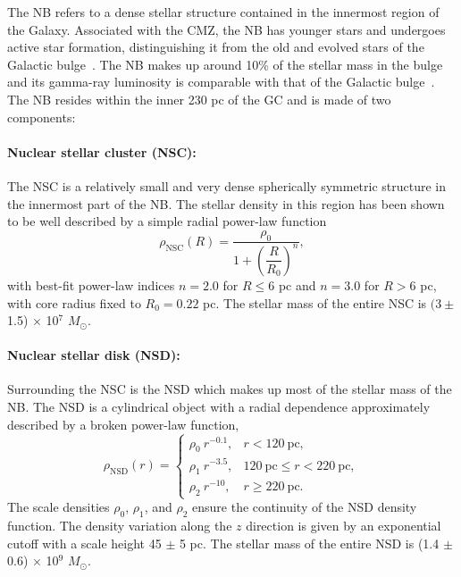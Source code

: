 \documentclass[doublespace,nopageskip]{VTthesis} %
\begin{document}
The NB refers to a dense stellar structure contained in the innermost region of the Galaxy. Associated with the CMZ, the NB has younger stars and undergoes active star formation, distinguishing it from the old and evolved stars of the Galactic bulge~\cite{Launhardt:2002tx}. The NB makes up around 10\% of the stellar mass in the bulge and its gamma-ray luminosity is comparable with that of the Galactic bulge~\cite{Macias:2016nev,Bartels:2017vsx}. The NB resides within the inner 230 pc of the GC and is made of two components:

\paragraph{Nuclear stellar cluster (NSC):} The NSC is a relatively small and very dense spherically symmetric structure in the innermost part of the NB. The stellar density in this region has been shown~\cite{Launhardt:2002tx} to be well described by a simple radial power-law function
\begin{equation}\label{eq:NSC}
  \rho_{\text{NSC}}(R)=\dfrac{\rho_0}{1+\left(\dfrac{R}{R_0}\right)^{n}},
\end{equation}
with best-fit power-law indices $n = 2.0$ for $R \leq 6$ pc and $n = 3.0$ for $R > 6$ pc, with core radius fixed to $R_0 = 0.22$ pc. The stellar mass of the entire NSC is $(3\pm$ 1.5) $\times$ 10$^7$ $M_\odot$.

\paragraph{Nuclear stellar disk (NSD):} Surrounding the NSC is the NSD which makes up most of the stellar mass of the NB. The NSD is a cylindrical object with a radial dependence approximately described by a broken power-law function,
\begin{equation}\label{eq:rhonsd}
  \rho_{\text{NSD}}(r) = \begin{cases}
    \rho_0\ r^{-0.1}, & r < 120\ \text{pc},\\
    \rho_1\ r^{-3.5}, & 120\ \text{pc} \leq r < 220\ \text{pc},\\
    \rho_2\ r^{-10}, & r \geq 220\ \text{pc}.
  \end{cases}
\end{equation}
The scale densities $\rho_0$, $\rho_1$, and $\rho_2$ ensure the continuity of the NSD density function. The density variation along the $z$ direction is given by an exponential cutoff with a scale height 45 $\pm$ 5 pc. The stellar mass of the entire NSD is (1.4 $\pm$ 0.6) $\times$ 10$^9$ $M_\odot$.
\end{document}
